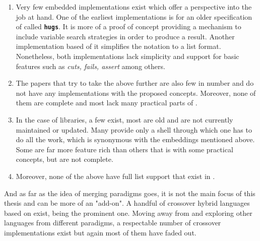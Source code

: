\documentclass[thesis-solanki.tex]{subfiles}
\begin{document}
\begin{enumerate}
\item Very few embedded implementations exist which offer a perspective into the job at hand. One of the earliest implementations 
\cite{website:mini-prolog-hugs98} is for an older specification of  called  
\texttt{\bfseries{hugs}}. It is more of a proof of concept providing a mechanism to include variable search strategies in order to produce 
a result. Another implementation \cite{website:takashi-workplace} based of it simplifies the notation to a list format. Nonetheless, both 
implementations lack simplicity and support for basic  features such as \textit{cuts, fails, assert} among others.   

\begin{comment}
\item Only two embeddings exist, one of them is old and made for \texttt{\bfseries{hugs}} a functional programming system based on the 
\progLang{Haskell 98} specification. It is complex and also lacks a lot of \progLang{Prolog} like features including \textit{cuts, fails, 
assert} among others. The second one is based off the first one to make it simple but it loses the variable search strategy support which 
allows the programmer to choose the manner in which a solution is produced. 
\end{comment}

\item The papers that try to take the above further are also few in number and do not have any implementations with the proposed 
concepts. Moreover, none of them are complete and most lack many practical parts of .

\item In the case of libraries, a few exist, most are old and are not currently maintained or updated. Many provide only a shell through which one has to do all the work, 
which is synonymous with the embeddings mentioned above. Some are far more feature rich than others that is with some practical  
concepts, but are not complete.

\item Moreover, none of the above have full list support that exist in .
\end{enumerate}

\par And as far as the idea of merging paradigms goes, it is not the main focus of this thesis and can be more of an "add-on". A handful of crossover hybrid 
languages based on  exist,  \cite{website:curry} being the prominent one. Moving away from  
and exploring other languages from different paradigms, a respectable number of crossover implementations exist but again most of them have faded out.   
\end{document}
